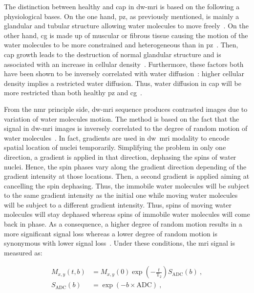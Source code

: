 The distinction between healthy and \ac{cap} in \ac{dw}-\ac{mri} is based on the following a physiological bases.
On the one hand, \ac{pz}, as previously mentioned, is mainly a glandular and tubular structure allowing water molecules to move freely~\cite{Choi2007,Hoeks2011}.
On the other hand, \ac{cg} is made up of muscular or fibrous tissue causing the motion of the water molecules to be more constrained and heterogeneous than in \ac{pz}~\cite{Hoeks2011}.
Then, \ac{cap} growth leads to the destruction of normal glandular structure and is associated with an increase in cellular density~\cite{Hoeks2011,Koh2007,Somford2008}.
Furthermore, these factors both have been shown to be inversely correlated with water diffusion~\cite{Koh2007,Somford2008}: higher cellular density implies a restricted water diffusion.
Thus, water diffusion in \ac{cap} will be more restricted than both healthy \ac{pz} and \ac{cg}~\cite{Koh2007,Hoeks2011}.

From the \ac{nmr} principle side, \ac{dw}-\ac{mri} sequence produces contrasted images due to variation of water molecules motion.
The method is based on the fact that the signal in \ac{dw}-\ac{mri} images is inversely correlated to the degree of random motion of water molecules~\cite{Huisman2003}.
In fact, gradients are used in \ac{dw}~\ac{mri} modality to encode spatial location of nuclei temporarily.
Simplifying the problem in only one direction, a gradient is applied in that direction, dephasing the spins of water nuclei.
Hence, the spin phases vary along the gradient direction depending of the gradient intensity at those locations.
Then, a second gradient is applied aiming at cancelling the spin dephasing.
Thus, the immobile water molecules will be subject to the same gradient intensity as the initial one while moving water molecules will be subject to a different gradient intensity.
Thus, spins of moving water molecules will stay dephased whereas spins of immobile water molecules will come back in phase.
As a consequence, a higher degree of random motion results in a more significant signal loss whereas a lower degree of random motion is synonymous with lower signal loss~\cite{Huisman2003}.
Under these conditions, the \ac{mri} signal is measured as:

\begin{align}
  M_{x,y}\left(t,b\right) & = M_{x,y}(0) \exp \left( - \frac{t}{\text{T}_2} \right) S_{\text{ADC}}(b) \ , \label{eq:t2dif} \\
  S_{\text{ADC}}(b) & = \exp \left( -b \times \text{ADC} \right) \ , \label{eq:dif}
\end{align}

